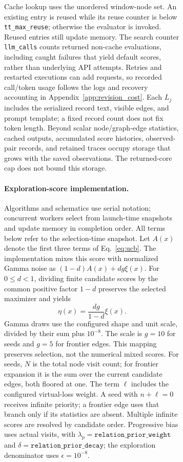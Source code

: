 \documentclass[11pt]{article}
\begin{document}
\begin{figure}[!t]
\begin{figure}[!t]
\begin{revadded}
Cache lookup uses the unordered window-node set. An existing entry is reused while its reuse counter is below \texttt{tt\_max\_reuse}; otherwise the evaluator is invoked. Reused entries still update memory. The search counter \texttt{llm\_calls} counts returned non-cache evaluations, including caught failures that yield default scores, rather than underlying API attempts. Retries and restarted executions can add requests, so recorded call/token usage follows the logs and recovery accounting in Appendix~\ref{app:revision_cost}. Each $L_j$ includes the serialized record text, visible edges, and prompt template; a fixed record count does not fix token length. Beyond scalar node/graph-edge statistics, cached outputs, accumulated score histories, observed-pair records, and retained traces occupy storage that grows with the saved observations. The returned-core cap does not bound this storage.

\paragraph{Exploration-score implementation.}
Algorithms and schematics use serial notation; concurrent workers select from launch-time snapshots and update memory in completion order. All terms below refer to the selection-time snapshot. Let $A(x)$ denote the first three terms of Eq.~\ref{eq:ucb}. The implementation mixes this score with normalized Gamma noise as $(1-d)A(x)+dg\xi(x)$. For $0\le d<1$, dividing finite candidate scores by the common positive factor $1-d$ preserves the selected maximizer and yields
\[
    \eta(x)=\frac{dg}{1-d}\xi(x).
\]
Gamma draws use the configured shape and unit scale, divided by their sum plus $10^{-8}$. The scale is $g=10$ for seeds and $g=5$ for frontier edges. This mapping preserves selection, not the numerical mixed scores. For seeds, $N$ is the total node visit count; for frontier expansion it is the sum over the current candidate edges, both floored at one. The term $\ell$ includes the configured virtual-loss weight. A seed with $n+\ell=0$ receives infinite priority; a frontier edge uses that branch only if its statistics are absent. Multiple infinite scores are resolved by candidate order. Progressive bias uses actual visits, with $\lambda_p=\texttt{relation\_prior\_weight}$ and $\delta=\texttt{relation\_prior\_decay}$; the exploration denominator uses $\epsilon=10^{-8}$.
\end{revadded}

\begin{revadded}

\end{revadded}
\end{figure}
\end{figure}
\end{document}
